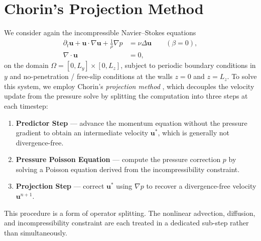 \section{Chorin's Projection Method}
We consider again the incompressible Navier--Stokes equations
\begin{align}
    \partial_t \mathbf{u} + \mathbf{u} \cdot \nabla \mathbf{u}
    + \frac{1}{\rho}\nabla p &= \nu \Delta \mathbf{u}
    \qquad (\beta = 0), \label{eq:ns_mom} \\
    \nabla \cdot \mathbf{u} &= 0, \label{eq:ns_div}
\end{align}
on the domain $\Omega = [0, L_y] \times [0, L_z]$, subject to periodic
boundary conditions in $y$ and no-penetration / free-slip conditions at
the walls $z = 0$ and $z = L_z$.
To solve this system, we employ Chorin's \textit{projection
method} \citep{Chorin1968}, which decouples the velocity update from the pressure solve by splitting the computation into three steps at each timestep:
\begin{enumerate}
    \item \textbf{Predictor Step} — advance the momentum equation without the
          pressure gradient to obtain an intermediate velocity
          $\mathbf{u}^*$, which is generally not divergence-free.
    \item \textbf{Pressure Poisson Equation} — compute the pressure correction $p$
          by solving a Poisson equation derived from the incompressibility
          constraint.
    \item \textbf{Projection Step} — correct $\mathbf{u}^*$ using $\nabla p$
          to recover a divergence-free velocity $\mathbf{u}^{n+1}$.
\end{enumerate}
This procedure is a form of operator splitting. The nonlinear advection,
diffusion, and incompressibility constraint are each treated in a
dedicated sub-step rather than simultaneously.

